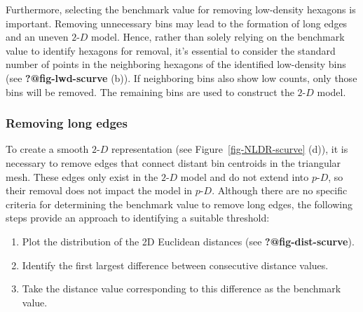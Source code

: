 \documentclass[
  12pt]{article}
\providecommand{\tightlist}{%
  \setlength{\itemsep}{0pt}\setlength{\parskip}{0pt}}\usepackage{longtable,booktabs,array}
\def\tightlist{}
\newcommand\pD{$p\text{-}D$}
\newcommand\gD{$2\text{-}D$}
\begin{document}
Furthermore, selecting the benchmark value for removing low-density
hexagons is important. Removing unnecessary bins may lead to the
formation of long edges and an uneven \gD{} model. Hence, rather than
solely relying on the benchmark value to identify hexagons for removal,
it's essential to consider the standard number of points in the
neighboring hexagons of the identified low-density bins (see
\textbf{?@fig-lwd-scurve} (b)). If neighboring bins also show low
counts, only those bins will be removed. The remaining bins are used to
construct the \gD{} model.

\subsubsection{Removing long edges}\label{removing-long-edges}

To create a smooth \gD{} representation (see
Figure~\ref{fig-NLDR-scurve} (d)), it is necessary to remove edges that
connect distant bin centroids in the triangular mesh. These edges only
exist in the \gD{} model and do not extend into \pD{}, so their removal
does not impact the model in \pD{}. Although there are no specific
criteria for determining the benchmark value to remove long edges, the
following steps provide an approach to identifying a suitable threshold:

\begin{enumerate}
\def\labelenumi{\arabic{enumi}.}
\tightlist
\item
  Plot the distribution of the 2D Euclidean distances (see
  \textbf{?@fig-dist-scurve}).
\item
  Identify the first largest difference between consecutive distance
  values.
\item
  Take the distance value corresponding to this difference as the
  benchmark value.
\end{enumerate}
\end{document}

